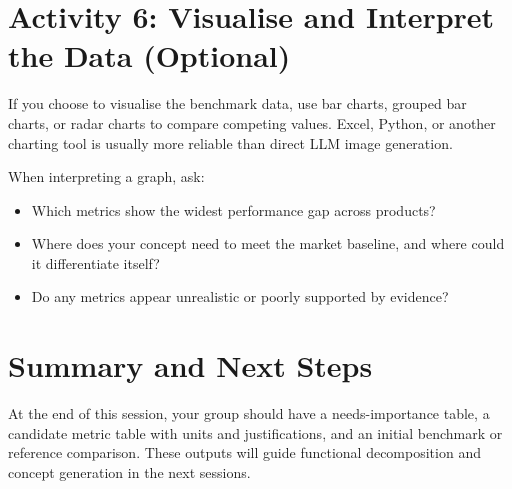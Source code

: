 \section{Activity 6: Visualise and Interpret the Data (Optional)}

If you choose to visualise the benchmark data, use bar charts, grouped bar charts, or radar charts to compare competing values. Excel, Python, or another charting tool is usually more reliable than direct LLM image generation.

When interpreting a graph, ask:
\begin{itemize}
    \item Which metrics show the widest performance gap across products?
    \item Where does your concept need to meet the market baseline, and where could it differentiate itself?
    \item Do any metrics appear unrealistic or poorly supported by evidence?
\end{itemize}

\section{Summary and Next Steps}

At the end of this session, your group should have a needs-importance table, a candidate metric table with units and justifications, and an initial benchmark or reference comparison. These outputs will guide functional decomposition and concept generation in the next sessions.
